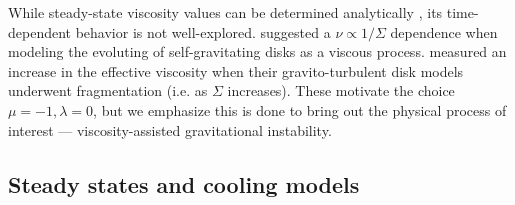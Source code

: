 
While steady-state viscosity values can be determined analytically
\citep[e.g.][]{rafikov15}, its time-dependent behavior is not
well-explored. \cite{laughlin96b} suggested a $\nu \propto 1/\Sigma$
dependence when modeling the evoluting of self-gravitating disks 
as a viscous process. \cite{paardekooper12} measured
an increase in the effective viscosity when their gravito-turbulent
disk models underwent fragmentation (i.e. as $\Sigma$ increases).  
These motivate the choice $\mu=-1,\lambda=0$, but we emphasize this is
done to bring out the physical process of interest --- viscosity-assisted
gravitational instability.


\subsection{Steady states and cooling models}

